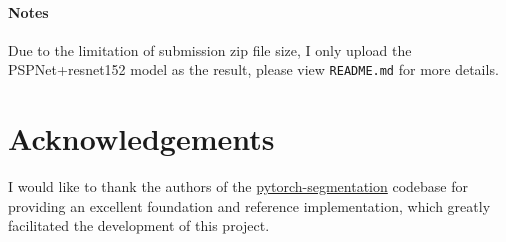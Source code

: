 \documentclass[a4 paper,12pt]{article}
\theoremstyle{definitionstyle}
\begin{document}
\paragraph{Notes}
Due to the limitation of submission zip file size, I only upload the PSPNet+resnet152 model as the result, please view \texttt{README.md} for more details.
\section*{Acknowledgements}
I would like to thank the authors of the \href{https://github.com/yassouali/pytorch-segmentation}{pytorch-segmentation} codebase for providing an excellent foundation and reference implementation, which greatly facilitated the development of this project.
\end{document}
